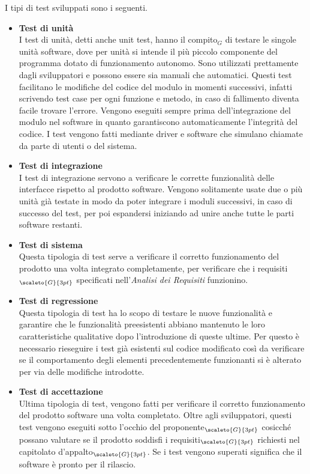I tipi di test sviluppati sono i seguenti. \\ 
\begin{itemize}
	\item[] \textbf{Test di unità} \\
		I test di unità, detti anche unit test, hanno il compito$_G$ di testare le singole unità software, dove per unità si intende il più piccolo componente del programma dotato di funzionamento autonomo.
		Sono utilizzati prettamente dagli sviluppatori e possono essere sia manuali che automatici.
		Questi test facilitano le modifiche del codice del modulo in momenti successivi, infatti scrivendo test case per ogni funzione e metodo, in caso di fallimento diventa facile trovare l’errore.
		Vengono eseguiti sempre prima dell’integrazione del modulo nel software in quanto garantiscono automaticamente l’integrità del codice.
		I test vengono fatti mediante driver e software che simulano chiamate da parte di utenti o del sistema.
	\item[] \textbf{Test di integrazione} \\
		I test di integrazione servono a verificare le corrette funzionalità delle interfacce rispetto al prodotto software.
		Vengono solitamente usate due o più unità già testate in modo da poter integrare i moduli successivi, in caso di successo del test, per poi espandersi iniziando ad unire anche tutte le parti software restanti.
	\item[] \textbf{Test di sistema} \\
		Questa tipologia di test serve a verificare il corretto funzionamento del prodotto una volta integrato completamente, per verificare che i requisiti$_{\scaleto{G}{3pt}}$ specificati nell’\textit{Analisi dei Requisiti} funzionino.
	\item[] \textbf{Test di regressione} \\
		Questa tipologia di test ha lo scopo di testare le nuove funzionalità e garantire che le funzionalità preesistenti abbiano mantenuto le loro caratteristiche qualitative dopo l’introduzione di queste ultime. Per questo è necessario rieseguire i test già esistenti sul codice modificato così da verificare se il comportamento degli elementi precedentemente funzionanti si è alterato per via delle modifiche introdotte.
	\item[] \textbf{Test di accettazione} \\
		Ultima tipologia di test, vengono fatti per verificare il corretto funzionamento del prodotto software una volta completato.
		Oltre agli sviluppatori, questi test vengono eseguiti sotto l’occhio del proponente$_{\scaleto{G}{3pt}}$ cosicché possano valutare se il prodotto soddisfi i requisiti$_{\scaleto{G}{3pt}}$ richiesti nel capitolato d’appalto$_{\scaleto{G}{3pt}}$.
		Se i test vengono superati significa che il software è pronto per il rilascio.
\end{itemize}

